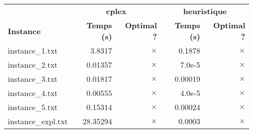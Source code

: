 \documentclass{article}
\begin{document}
\begin{center}
\renewcommand{\arraystretch}{1.4} 
 \begin{tabular}{lrrrr}
	\hline
 & \multicolumn{2}{c}{\textbf{cplex}} & \multicolumn{2}{c}{\textbf{heuristique}}\\
\textbf{Instance}  & \textbf{Temps (s)} & \textbf{Optimal ?}  & \textbf{Temps (s)} & \textbf{Optimal ?} \\\hline

instance\_1.txt & 3.8317 & 
$\times$
 & 0.1878 & 
$\times$
\\
instance\_2.txt & 0.01357 & 
$\times$
 & 7.0e-5 & 
$\times$
\\
instance\_3.txt & 0.01817 & 
$\times$
 & 0.00019 & 
$\times$
\\
instance\_4.txt & 0.00555 & 
$\times$
 & 4.0e-5 & 
$\times$
\\
instance\_5.txt & 0.15314 & 
$\times$
 & 0.00024 & 
$\times$
\\
instance\_expl.txt & 28.35294 & 
$\times$
 & 0.0003 & 
$\times$
\\
\hline\end{tabular}
\end{center}
\end{document}
